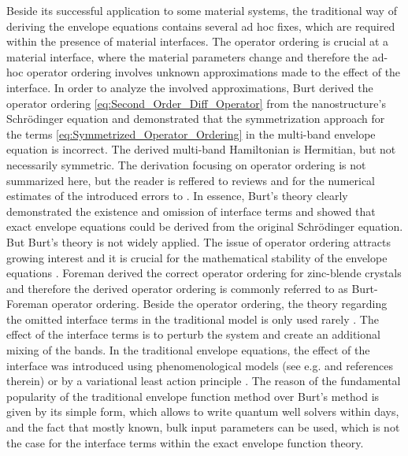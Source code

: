 Beside its successful application to some material systems, the traditional
way of deriving the envelope equations contains several ad hoc fixes,
which are required within the presence of material interfaces. The
operator ordering is crucial at a material interface, where the material
parameters change and therefore the ad-hoc operator ordering involves
unknown approximations made to the effect of the interface. In order
to analyze the involved approximations, Burt \citet{Burt1994,Burt1999,Burt1992,Burt1988}
derived the operator ordering \ref{eq:Second_Order_Diff_Operator}
from the nanostructure\textquoteright{}s Schr\"{o}dinger  equation
and demonstrated that the symmetrization approach for the terms \ref{eq:Symmetrized_Operator_Ordering}
in the multi-band envelope equation is incorrect. The derived multi-band
Hamiltonian is Hermitian, but not necessarily symmetric. The derivation
focusing on operator ordering is not summarized here, but the reader
is reffered to reviews \citet{Burt1992,Burt1999} and for the numerical
estimates of the introduced errors to \citet{Burt1994}. In essence,
Burt\textquoteright{}s theory clearly demonstrated the existence and
omission of interface terms and showed that exact envelope equations
could be derived from the original Schr\"{o}dinger  equation. But
Burt\textquoteright{}s theory is not widely applied. The issue of
operator ordering attracts growing interest and it is crucial for
the mathematical stability of the envelope equations \citet{Veprek2008}.
Foreman \citet{Foreman1993} derived the correct operator ordering
for zinc-blende crystals and therefore the derived operator ordering
is commonly referred to as Burt-Foreman operator ordering. Beside
the operator ordering, the theory regarding the omitted interface
terms in the traditional model is only used rarely \citet{Foreman1998a,Foreman1995b}.
The effect of the interface terms is to perturb the system and create
an additional mixing of the bands. In the traditional envelope equations,
the effect of the interface was introduced using phenomenological
models (see e.g. \citet{Krebs1999b} and references therein) or by
a variational least action principle \citet{Rodina2006}. The reason
of the fundamental popularity of the traditional envelope function
method over Burt\textquoteright{}s method is given by its simple form,
which allows to write quantum well solvers within days, and the fact
that mostly known, bulk input parameters can be used, which is not
the case for the interface terms within the exact envelope function
theory. 


